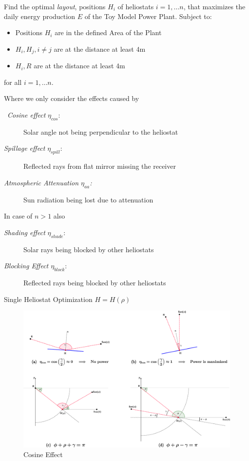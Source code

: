 \documentclass[10pt, xcolor={dvipsnames}]{beamer}
\begin{document}
\begin{frame}
\begin{definition}
Find the optimal {\it layout}, positions $H_{i}$ of heliostats $i = 1, \dots n$, that maximizes the daily energy production $E$ of the Toy Model Power Plant. Subject to: 
\begin{itemize}
\item Positions $H_{i}$ are in the defined Area of the Plant
\item $H_{i}, H_{j}, i\neq j$ are at the distance at least 4m
\item $H_{i}, R$ are at the distance at least 4m
\end{itemize}
for all $i = 1,\dots n$.
\end{definition}
\vspace{.5cm}
Where we only consider the effects caused by
\begin{description}
\item[\, {\it Cosine effect} $\eta_{cos}:$] Solar angle not being perpendicular to the heliostat 
\item[\; {\it Spillage effect} $\eta_{spill}:$] Reflected rays from flat mirror missing the receiver
\item[\; {\it Atmospheric Attenuation $\eta_{aa}$:}] Sun radiation being lost due to attenuation
\end{description}
\vspace{.5cm}
In case of $n > 1$ also
\begin{description}
\item[\; {\it Shading effect} $\eta_{shade}:$] Solar rays being blocked by other heliostats
\item[\; {\it Blocking Effect $\eta_{block}:$}] Reflected rays being blocked by other heliostats
\end{description}
\end{frame}

\begin{frame}{Single Heliostat Optimization $H = H(\rho)$}
\begin{center}
\begin{figure}
\includegraphics[width=.95\textwidth]{../figures/cos-effect-crop.pdf}
\caption{Cosine Effect}
\end{figure}
\end{center}
\end{frame}
\end{document}
